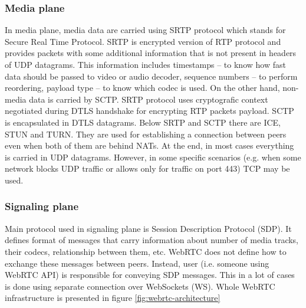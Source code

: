 \subsubsection{Media plane}
In media plane, media data are carried using SRTP protocol which stands for Secure Real Time Protocol.
SRTP is encrypted version of RTP protocol and provides packets with some additional information that is not present in headers of UDP datagrams.
This information includes timestamps -- to know how fast data should be passed to video or audio decoder, sequence numbers -- to perform reordering, payload type -- to know which codec is used.
On the other hand, non-media data is carried by SCTP.
SRTP protocol uses cryptografic context negotiated during DTLS handshake for encrypting RTP packets payload.
SCTP is encapsulated in DTLS datagrams.
Below SRTP and SCTP there are ICE, STUN and TURN.
They are used for establishing a connection between peers even when both of them are behind NATs.
At the end, in most cases everything is carried in UDP datagrams.
However, in some specific scenarios (e.g. when some network blocks UDP traffic or allows only for traffic on port 443) TCP may be used.

\subsubsection{Signaling plane}

Main protocol used in signaling plane is Session Description Protocol (SDP).
It defines format of messages that carry information about number of media tracks, their codecs, relationship between them, etc.
WebRTC does not define how to exchange these messages between peers.
Instead, user (i.e. someone using WebRTC API) is responsible for conveying SDP messages.
This in a lot of cases is done using separate connection over WebSockets (WS).
Whole WebRTC infrastructure is presented in figure \ref{fig:webrtc-architecture}


